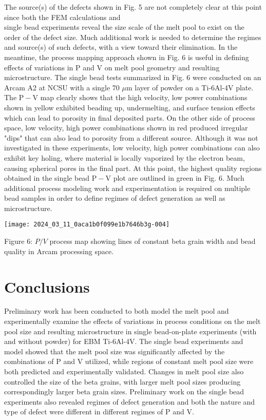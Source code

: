 \documentclass[10pt]{article}
\begin{document}
The source(s) of the defects shown in Fig. 5 are not completely clear at this point since both the FEM calculations and\\
single bead experiments reveal the size scale of the melt pool to exist on the order of the defect size. Much additional work is needed to determine the regimes and source(s) of such defects, with a view toward their elimination. In the meantime, the process mapping approach shown in Fig. 6 is useful in defining effects of variations in $\mathrm{P}$ and $\mathrm{V}$ on melt pool geometry and resulting microstructure. The single bead tests summarized in Fig. 6 were conducted on an Arcam A2 at NCSU with a single 70 $\mu \mathrm{m}$ layer of powder on a Ti-6Al-4V plate. The $\mathrm{P}-\mathrm{V}$ map clearly shows that the high velocity, low power combinations shown in yellow exhibited beading up, undermelting, and surface tension effects which can lead to porosity in final deposited parts. On the other side of process space, low velocity, high power combinations shown in red produced irregular "dips" that can also lead to porosity from a different source. Although it was not investigated in these experiments, low velocity, high power combinations can also exhibit key holing, where material is locally vaporized by the electron beam, causing spherical pores in the final part. At this point, the highest quality regions obtained in the single bead $\mathrm{P}-\mathrm{V}$ plot are outlined in green in Fig. 6. Much additional process modeling work and experimentation is required on multiple bead samples in order to define regimes of defect generation as well as microstructure.

\begin{center}
\texttt{[image: 2024\_03\_11\_0aca1b0f099e1b7646b3g-004]}
\end{center}

Figure 6: $P / V$ process map showing lines of constant beta grain width and bead quality in Arcam processing space.

\section*{Conclusions}
Preliminary work has been conducted to both model the melt pool and experimentally examine the effects of variations in process conditions on the melt pool size and resulting microstructure in single bead-on-plate experiments (with and without powder) for EBM Ti-6Al-4V. The single bead experiments and model showed that the melt pool size was significantly affected by the combinations of $\mathrm{P}$ and $\mathrm{V}$ utilized, while regions of constant melt pool size were both predicted and experimentally validated. Changes in melt pool size also controlled the size of the beta grains, with larger melt pool sizes producing correspondingly larger beta grain sizes. Preliminary work on the single bead experiments also revealed regimes of defect generation and both the nature and type of defect were different in different regimes of $\mathrm{P}$ and $\mathrm{V}$.
\end{document}
